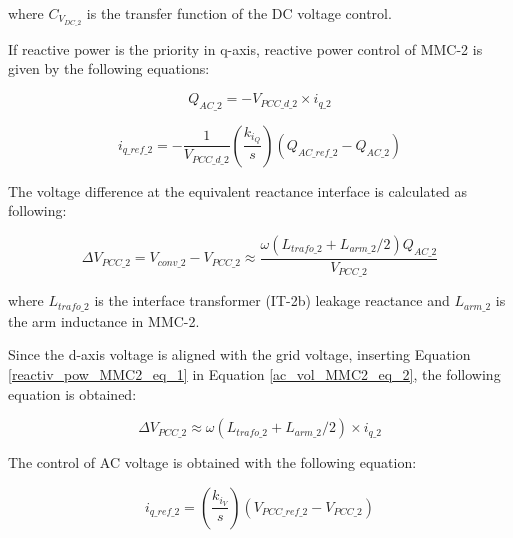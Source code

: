 where $C_{V_{DC\_2}}$ is the transfer function of the \gls{DC} voltage control.

If reactive power is the priority in q-axis, reactive power control of \gls{MMC}-2 is given by the following equations:

\begin{equation}\label{reactiv_pow_MMC2_eq_1}
    Q_{AC\_2} = -V_{PCC\_d\_2} \times i_{q\_2}
\end{equation}

\begin{equation}\label{reactiv_pow_MMC2_eq_2}
    i_{q\_ref\_2} = -  \frac{1}{V_{PCC\_d\_2}} \left(\frac{k_{i_Q}}{s}\right)\left(Q_{AC\_ref\_2}-Q_{AC\_2}\right)
\end{equation}

The voltage difference at the equivalent reactance interface is calculated as following:

\begin{equation}\label{ac_vol_MMC2_eq_2}
    \Delta V_{PCC\_2} = V_{conv\_2} - V_{PCC\_2} \approx \frac{\omega(L_{trafo\_2}+L_{arm\_2}/2)Q_{AC\_2}}{V_{PCC\_2}}
\end{equation}

where $L_{trafo\_2}$ is the interface transformer (IT-2b) leakage reactance and $L_{arm\_2}$ is the arm inductance in \gls{MMC}-2.

Since the d-axis voltage is aligned with the grid voltage, inserting Equation \ref{reactiv_pow_MMC2_eq_1} in Equation \ref{ac_vol_MMC2_eq_2}, the following equation is obtained:

\begin{equation}
   \Delta V_{PCC\_2} \approx \omega(L_{trafo\_2}+L_{arm\_2}/2)\times i_{q\_2}
\end{equation}

The control of \gls{AC} voltage is obtained with the following equation:

\begin{equation}
    i_{q\_ref\_2} =  \left(\frac{k_{i_V}}{s}\right)\left(V_{PCC\_{ref}\_2}-V_{PCC\_2}\right)
\end{equation}


